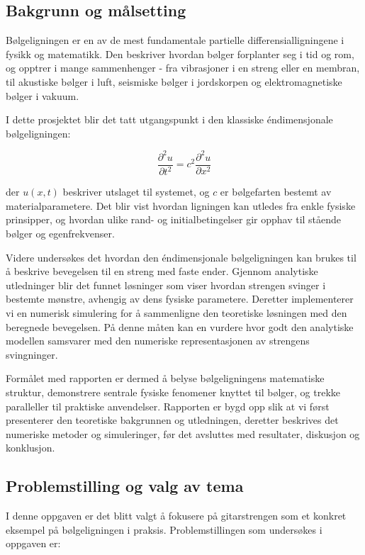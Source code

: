 \subsection{Bakgrunn og målsetting}
Bølgeligningen er en av de mest fundamentale partielle differensialligningene i fysikk og matematikk. 
Den beskriver hvordan bølger forplanter seg i tid og rom, og opptrer i mange sammenhenger - fra 
vibrasjoner i en streng eller en membran, til akustiske bølger i luft, seismiske bølger i jordskorpen 
og elektromagnetiske bølger i vakuum. 

I dette prosjektet blir det tatt utgangspunkt i den klassiske éndimensjonale bølgeligningen:

\begin{equation}
    \frac{\partial^2 u}{\partial t^2} = c^2 \frac{\partial^2 u}{\partial x^2}
    \label{eq:bølgeligningen}
\end{equation}

der $u(x,t)$ beskriver utslaget til systemet, og $c$ er bølgefarten bestemt av materialparametere. 
Det blir vist hvordan ligningen kan utledes fra enkle fysiske prinsipper, og hvordan ulike rand- og 
initialbetingelser gir opphav til stående bølger og egenfrekvenser. 

Videre undersøkes det hvordan den éndimensjonale bølgeligningen kan brukes til å beskrive bevegelsen til 
en streng med faste ender. Gjennom analytiske utledninger blir det funnet løsninger som viser hvordan strengen 
svinger i bestemte mønstre, avhengig av dens fysiske parametere. Deretter implementerer vi en numerisk 
simulering for å sammenligne den teoretiske løsningen med den beregnede bevegelsen. 
På denne måten kan en vurdere hvor godt den analytiske modellen samsvarer med den numeriske 
representasjonen av strengens svingninger.

Formålet med rapporten er dermed å belyse bølgeligningens matematiske struktur, demonstrere sentrale 
fysiske fenomener knyttet til bølger, og trekke paralleller til praktiske anvendelser. Rapporten er 
bygd opp slik at vi først presenterer den teoretiske bakgrunnen og utledningen, deretter beskrives det 
numeriske metoder og simuleringer, før det avsluttes med resultater, diskusjon og konklusjon.

\subsection{Problemstilling og valg av tema}

I denne oppgaven er det blitt valgt å fokusere på gitarstrengen som et konkret eksempel på
bølgeligningen i praksis. Problemstillingen som undersøkes i oppgaven er:

